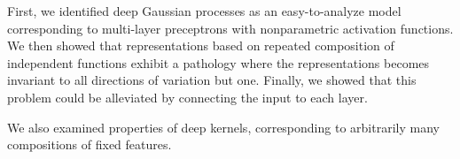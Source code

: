 First, we identified deep Gaussian processes as an easy-to-analyze model corresponding to multi-layer preceptrons with nonparametric activation functions.
%
We then showed that representations based on repeated composition of independent functions exhibit a pathology where the representations becomes invariant to all directions of variation but one. %
Finally, we showed that this problem could be alleviated by connecting the input to each layer.

We also examined properties of deep kernels, corresponding to arbitrarily many compositions of fixed features.





